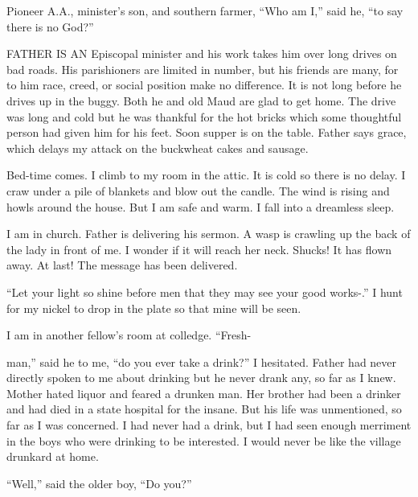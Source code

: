 

\bbChapterPreamble




\begin{biblechapter}
    Pioneer A.A., minister’s son, 
    and southern farmer,
    “Who am I,” said he, 
    “to say there is no God?”
\end{biblechapter}


\begin{biblechapter}
    FATHER IS AN Episcopal minister and his work takes him over long drives on bad roads.
\verse His parishioners are limited in number, 
    but his friends are many, 
    for to him race, creed, or social position make no difference.
\verse It is not long before he drives up in the buggy.
\verse Both he and old Maud are glad to get home.
\verse The drive was long and cold but he was thankful for the hot bricks 
    which some thoughtful person had given him for his feet.
\verse Soon supper is on the table.
\verse Father says grace, 
    which delays my attack on the buckwheat cakes and sausage.

\verse Bed-time comes. I climb to my room in the attic. It is cold so there is no delay. I craw under a pile of blankets and blow out the candle. The wind is rising and howls around the house. But I am safe and warm. I fall into a dreamless sleep.

I am in church. Father is delivering his sermon. A wasp is crawling up the back of the lady in front of me. I wonder if it will reach her neck. Shucks! It has flown away. At last! The message has been delivered.

“Let your light so shine before men that they may see your good works-.” I hunt for my nickel to drop in the plate so that mine will be seen.

I am in another fellow’s room at colledge. “Fresh-

man,” said he to me, “do you ever take a drink?” I hesitated. Father had never directly spoken to me about drinking but he never drank any, so far as I knew. Mother hated liquor and feared a drunken man. Her brother had been a drinker and had died in a state hospital for the insane. But his life was unmentioned, so far as I was concerned. I had never had a drink, but I had seen enough merriment in the boys who were drinking to be interested. I would never be like the village drunkard at home.

“Well,” said the older boy, “Do you?”


\end{biblechapter}
